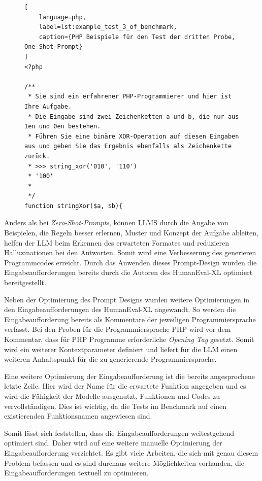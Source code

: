 \begin{figure}[!ht]
\begin{lstlisting}[
	language=php,
	label=lst:example_test_3_of_benchmark,
	caption={PHP Beispiele für den Test der dritten Probe, One-Shot-Prompt}
]
<?php

/**
 * Sie sind ein erfahrener PHP-Programmierer und hier ist Ihre Aufgabe.
 * Die Eingabe sind zwei Zeichenketten a und b, die nur aus 1en und 0en bestehen.
 * Führen Sie eine binäre XOR-Operation auf diesen Eingaben aus und geben Sie das Ergebnis ebenfalls als Zeichenkette zurück.
 * >>> string_xor('010', '110')
 * '100'
 *
 */
function stringXor($a, $b){
\end{lstlisting}
\end{figure}

Anders als bei \textit{Zero-Shot-Prompts}, können LLMS durch die Angabe von Beispielen, die Regeln besser erlernen, Muster und Konzept der Aufgabe ableiten, helfen der LLM beim Erkennen des erwarteten Formates und reduzieren Halluzinationen bei den Antworten. Somit wird eine Verbesserung des generieren Programmcodes erreicht. Durch das Anwenden dieses Prompt-Design wurden die Eingabeaufforderungen bereits durch die Autoren des HumanEval-XL optimiert bereitgestellt.\vspace{0.2cm}

Neben der Optimierung des Prompt Designs wurden weitere Optimierungen in den Eingabeaufforderungen des HumanEval-XL angewandt. So werden die Eingabeaufforderung bereits als Kommentare der jeweiligen Programmiersprache verfasst. Bei den Proben für die Programmiersprache PHP wird vor dem Kommentar, dass für PHP Programme erforderliche \textit{Opening Tag} gesetzt. Somit wird ein weiterer Kontextparameter definiert und liefert für die LLM einen weiteren Anhaltspunkt für die zu generierende Programmiersprache.\vspace{0.2cm}

Eine weitere Optimierung der Eingabeaufforderung ist die bereits angesprochene letzte Zeile. Hier wird der Name für die erwartete Funktion angegeben und es wird die Fähigkeit der Modelle ausgenutzt, Funktionen und Codes zu vervollständigen. Dies ist wichtig, da die Tests im Benchmark auf einen existierenden Funktionsnamen angewiesen sind.\vspace{0.2cm}

Somit lässt sich feststellen, dass die Eingabeaufforderungen weitestgehend optimiert sind. Daher wird auf eine weitere manuelle Optimierung der Eingabeaufforderung verzichtet. Es gibt viele Arbeiten, die sich mit genau diesem Problem befassen und es sind durchaus weitere Möglichkeiten vorhanden, die Eingabeaufforderungen textuell zu optimieren.\vspace{0.2cm}



